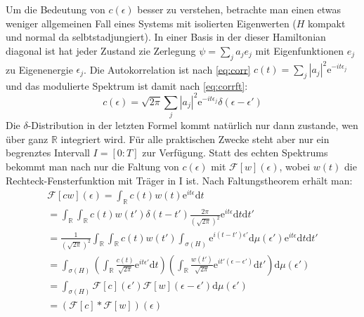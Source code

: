 \documentclass[10pt,a4paper,german]{scrartcl}
\begin{document}
		Um die Bedeutung von $c(\epsilon)$ besser zu verstehen, betrachte man einen
		etwas weniger allgemeinen Fall eines Systems mit isolierten Eigenwerten
		($H$ kompakt und normal da selbtstadjungiert). In einer Basis in der 
		dieser Hamiltonian diagonal ist hat jeder Zustand zie Zerlegung
		$\psi=\sum_{j}{a_j e_j}$ mit Eigenfunktionen $e_j$ zu Eigenenergie $\epsilon_j$.
		Die Autokorrelation ist nach \eqref{eq:corr}
		$c(t)= \sum_{j} |a_j|^2 \mathrm{e}^{-i t \epsilon_j}$ und das modulierte Spektrum
		ist damit nach \eqref{eq:corrft}:
		\begin{equation}
			c(\epsilon)=\sqrt{2 \pi}
				 \sum_{j} |a_j|^2 \mathrm{e}^{-i t \epsilon_j} \delta(\epsilon-\epsilon')
		\end{equation}
		Die $\delta$-Distribution in der letzten Formel kommt natürlich nur dann zustande,
		wen über ganz $\mathbb{R}$ integriert wird. Für alle praktischen Zwecke steht
		aber nur ein begrenztes Intervall $I=[0:T]$ zur Verfügung. Statt des echten Spektrums
		bekommt man nach nur die Faltung von $c(\epsilon)$ mit $\mathcal{F}[w](\epsilon)$,
		wobei $w(t)$ die Rechteck-Fensterfunktion mit Träger in I ist. Nach Faltungstheorem
		erhält man:
		\begin{multline}
			\mathcal{F}[c w](\epsilon)
				= \int_{\mathbb{R}} c(t) w(t) \mathrm{e}^{i t \epsilon} \mathrm{d}t \\
				= \int_{\mathbb{R}}
					 	\int_{\mathbb{R}}
					 		 c(t) w(t') \delta(t-t') \frac{2 \pi}{(\sqrt{2 \pi})^2}
					 		 	 \mathrm{e}^{i t \epsilon} 
						\mathrm{d}t
					\mathrm{d}t'\\
				= \frac{1}{(\sqrt{2 \pi})^2} \int_{\mathbb{R}}
					 	\int_{\mathbb{R}}
					 		 c(t) w(t')
					 		   \int_{\sigma(H)} \mathrm{e}^{i (t - t')\epsilon'} \mathrm{d}\mu(\epsilon')
					 		 	 \mathrm{e}^{i t \epsilon} 
						\mathrm{d}t
					\mathrm{d}t'\\
				= 
 		  	\int_{\sigma(H)} 
					\left(\int_{\mathbb{R}}
						 \frac{c(t)}{\sqrt{2 \pi}} \mathrm{e}^{i t\epsilon'} \mathrm{d}t\right)
					\left(\int_{\mathbb{R}} 
						\frac{w(t')}{\sqrt{2 \pi}}  \mathrm{e}^{i t' (\epsilon-\epsilon')}
							\mathrm{d}t'\right)
				\mathrm{d}\mu(\epsilon')\\
				= \int_{\sigma(H)} 
	 		  		\mathcal{F}[c](\epsilon') \mathcal{F}[w](\epsilon-\epsilon')
					\mathrm{d}\mu(\epsilon')\\
				= (\mathcal{F}[c] * \mathcal{F}[w])(\epsilon)
		\end{multline}
\end{document}
